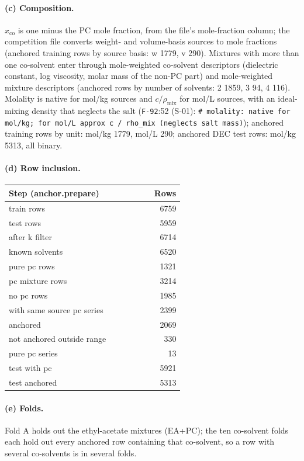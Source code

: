 \paragraph{(c) Composition.} $x_{\mathrm{co}}$ is one minus the PC mole fraction, from the file's mole-fraction column; the competition file converts weight- and volume-basis sources to mole fractions (anchored training rows by source basis: w 1779, v 290). Mixtures with more than one co-solvent enter through mole-weighted co-solvent descriptors (dielectric constant, log viscosity, molar mass of the non-PC part) and mole-weighted mixture descriptors (anchored rows by number of solvents: 2 1859, 3 94, 4 116). Molality is native for mol/kg sources and $c/\rho_{\mathrm{mix}}$ for mol/L sources, with an ideal-mixing density that neglects the salt (\texttt{F-92}:52 (S-01): \texttt{\# molality: native for mol/kg; for mol/L approx c / rho\_mix (neglects salt mass)}); anchored training rows by unit: mol/kg 1779, mol/L 290; anchored DEC test rows: mol/kg 5313, all binary.

\paragraph{(d) Row inclusion.}

{\footnotesize\setlength{\tabcolsep}{3pt}
\begin{longtable}{R{0.6\linewidth} r}
\toprule
Step (anchor.prepare) & Rows \\
\midrule
\endhead
train rows & 6759 \\
test rows & 5959 \\
after k filter & 6714 \\
known solvents & 6520 \\
pure pc rows & 1321 \\
pc mixture rows & 3214 \\
no pc rows & 1985 \\
with same source pc series & 2399 \\
anchored & 2069 \\
not anchored outside range & 330 \\
pure pc series & 13 \\
test with pc & 5921 \\
test anchored & 5313 \\
\bottomrule
\end{longtable}}
\paragraph{(e) Folds.} Fold A holds out the ethyl-acetate mixtures (EA+PC); the ten co-solvent folds each hold out every anchored row containing that co-solvent, so a row with several co-solvents is in several folds.

